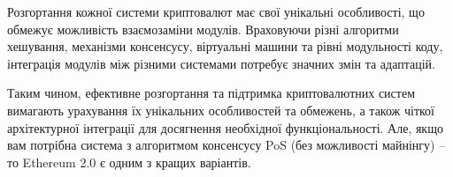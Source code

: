 

\newpage
\chapconclude{\ref{chap:theory}}

Розгортання кожної системи криптовалют має свої унікальні особливості, що обмежує можливість взаємозаміни модулів. Враховуючи різні алгоритми хешування, механізми консенсусу, віртуальні машини та рівні модульності коду, інтеграція модулів між різними системами потребує значних змін та адаптацій.

Таким чином, ефективне розгортання та підтримка криптовалютних систем вимагають урахування їх унікальних особливостей та обмежень, а також чіткої архітектурної інтеграції для досягнення необхідної функціональності. Але, якщо вам потрібна система з алгоритмом консенсусу PoS (без можливості майнінгу) -- то Ethereum 2.0 є одним з кращих варіантів.